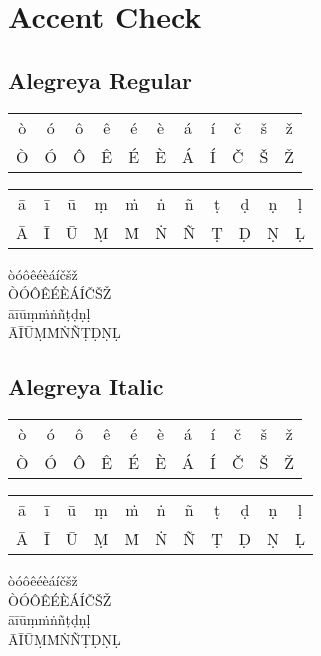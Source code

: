 
\chapter{Accent Check}

\section{Alegreya Regular}

\AlegreyaFont

\noindent
\begin{tabular}{ccccccccccc}
ò & ó & ô & ê & é & è & á & í & č & š & ž\\
Ò & Ó & Ô & Ê & É & È & Á & Í & Č & Š & Ž\\
\end{tabular}

\noindent
\begin{tabular}{ccccccccccc}
ā & ī & ū & ṃ & ṁ & ṅ & ñ & ṭ & ḍ & ṇ & ḷ\\
Ā & Ī & Ū & Ṃ & Ṁ & Ṅ & Ñ & Ṭ & Ḍ & Ṇ & Ḷ\\
\end{tabular}

\noindent
òóôêéèáíčšž\\
ÒÓÔÊÉÈÁÍČŠŽ\\
āīūṃṁṅñṭḍṇḷ\\
ĀĪŪṂṀṄÑṬḌṆḶ

\section{Alegreya Italic}

\AlegreyaFont

{\itshape

\noindent
\begin{tabular}{ccccccccccc}
ò & ó & ô & ê & é & è & á & í & č & š & ž\\
Ò & Ó & Ô & Ê & É & È & Á & Í & Č & Š & Ž\\
\end{tabular}

\noindent
\begin{tabular}{ccccccccccc}
ā & ī & ū & ṃ & ṁ & ṅ & ñ & ṭ & ḍ & ṇ & ḷ\\
Ā & Ī & Ū & Ṃ & Ṁ & Ṅ & Ñ & Ṭ & Ḍ & Ṇ & Ḷ\\
\end{tabular}

\noindent
òóôêéèáíčšž\\
ÒÓÔÊÉÈÁÍČŠŽ\\
āīūṃṁṅñṭḍṇḷ\\
ĀĪŪṂṀṄÑṬḌṆḶ

}

